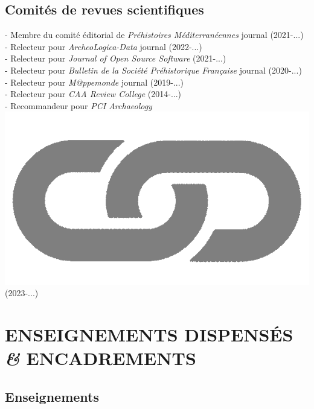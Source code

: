 \documentclass{article}
\begin{document}
\subsection*{Comités de revues scientifiques}

- Membre du comité éditorial de \textit{Pr\'ehistoires M\'editerran\'eennes} journal (2021-...)\\ 
- Relecteur pour \textit{ArcheoLogica-Data} journal (2022-...)\\
- Relecteur pour \textit{Journal of Open Source Software} (2021-...)\\
- Relecteur pour \textit{Bulletin de la Soci\'{e}t\'{e} Pr\'{e}historique Fran\c{c}aise} journal (2020-...)\\
- Relecteur pour \textit{M@ppemonde} journal (2019-...)\\ 
- Relecteur pour \textit{CAA Review College} (2014-...)\\ 
- Recommandeur pour \textit{PCI Archaeology} \href{https://archaeo.peercommunityin.org/public/user_public_page?userId=1235}{\includegraphics[scale=0.02]{link_grey.png}} (2023-...)\\

\section*{ENSEIGNEMENTS DISPENSÉS \textit{\&} ENCADREMENTS}

\subsection*{Enseignements}
\end{document}
